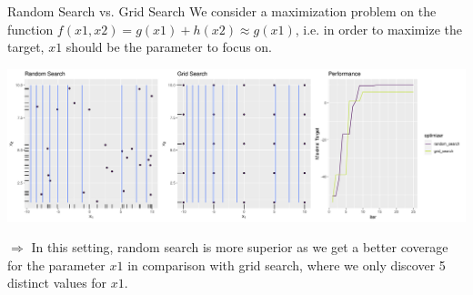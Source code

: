 \begin{vbframe}{Random Search vs. Grid Search}
	We consider a maximization problem on the function $f(x1,x2)=g(x1)+h(x2)\approx g(x1)$, i.e. in order to maximize the target, $x1$ should be the parameter to focus on.
	\vspace{0.5cm}
	\begin{knitrout}\scriptsize
		\color{fgcolor}
		
		{\centering \includegraphics[width=\textwidth]{figure/rs_gs_simulation_plot} 
		}
		
	\end{knitrout}
	$\Rightarrow$ In this setting, random search is more superior as we get a better coverage for the parameter $x1$ in comparison with grid search, where we only discover 5 distinct values for $x1$.
\end{vbframe}

